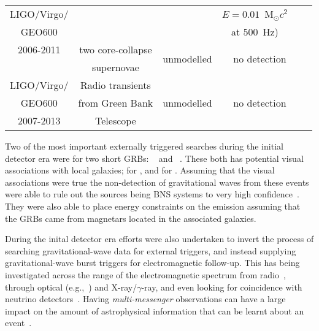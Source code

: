 \begin{longtable}{c|ccccc}
LIGO/Virgo/ &                                 &                             & $E = 0.01$~M$_{\odot}c^2$  & & \\
GEO600      &                                 &                             &  at 500~Hz)                & & \\
\cline{2-6}
2006-2011   & two core-collapse & \multirow{2}{*}{unmodelled} & \multicolumn{2}{c}{\multirow{2}{*}{no detection}} & \multirow{2}{*}{\cite{Abbott:2016tdt}} \\
            & supernovae        &                             &                                                   & \\
\hline
LIGO/Virgo/ & Radio transients & \multirow{3}{*}{unmodelled} & \multicolumn{2}{c}{\multirow{3}{*}{no detection}} & \multirow{3}{*}{\cite{2016PhRvD..93l2008A}} \\
GEO600      & from Green Bank  &                             & & \\
2007-2013   & Telescope        &                             & & \\
\hline
\hline
\end{longtable}

Two of the most important externally triggered searches during the initial detector era were for two short GRBs: ~\cite{Golenetskii:2007a,Golenetskii:2007b} and 
~\cite{2005GCN..4197....1G}. These both has potential visual
associations with local galaxies;  for , and  for
. Assuming that the visual associations were true the non-detection of gravitational
waves from these events were able to rule out the sources being BNS systems to very high confidence~\cite{Abbott:2008g,2012ApJ...755....2A}.
They were also able to place energy constraints on the emission assuming that the GRBs came from magnetars located
in the associated galaxies.

During the inital detector era efforts were also undertaken to invert the process of searching gravitational-wave data for external 
triggers, and instead supplying gravitational-wave burst triggers for electromagnetic follow-up. This has
being investigated across the range of the electromagnetic spectrum from radio~\cite{Predoi:2010}, through
optical (e.g.,~\cite{Kanner:2008, Coward:2010}) and X-ray/$\gamma$-ray, and even looking for coincidence with 
neutrino detectors~\cite{Aso:2008, Pradier:2010, Chassande:2010}. Having \textit{multi-messenger} 
observations can have a large impact on the amount of astrophysical information that can be learnt about
an event~\cite{Phinney:2009}.

